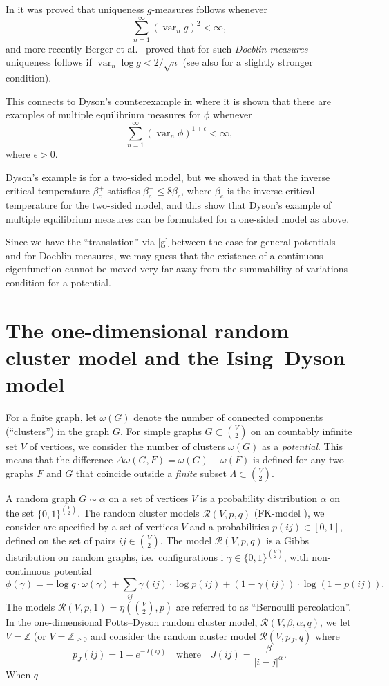 \documentclass[11pt, a4paper]{amsart}
\theoremstyle{definition}
\theoremstyle{remark}
\providecommand{\ZZ}{\mathbb{Z}}
\providecommand{\mscr}{\mathscr}
\providecommand{\opn}{\operatorname}
\providecommand{\var}{\opn{var}}
\providecommand{\w}{\omega}
\begin{document}
In \cite{johob} it was proved that uniqueness $g$-measures follows
whenever
$$ \sum_{n=1}^\infty (\var_n g)^2<\infty, $$
and more recently Berger et al.\ \cite{berger2} proved that for such {\em Doeblin
measures} uniqueness follows if $\var_n \log g <2/\sqrt{n}$ (see also
\cite{johob3} for a slightly stronger condition).

This connects to Dyson's counterexample in \cite{dyson} where it is shown that
there are examples of multiple equilibrium measures for $\phi$ whenever
$$\sum_{n=1}^\infty (\var_n \phi)^{1+\epsilon}<\infty,$$
where $\epsilon>0$.

Dyson's example is for a two-sided model, but we showed in \cite{johob4} that
the inverse critical temperature $\beta_c^+$ satisfies $\beta_c^+\leq 8\beta_c$, where $\beta_c$ is
the inverse critical temperature for the two-sided model, and this show that
Dyson's example of multiple equilibrium measures can be formulated for a
one-sided model as above.

Since we have the ``translation'' via \eqref{g} between the case for general
potentials and for Doeblin measures, we may guess that the existence of a
continuous eigenfunction cannot be moved very far away from the summability of
variations condition for a potential.

\section{The one-dimensional random cluster model and the Ising--Dyson model}

For a finite graph, let $\w(G)$ denote the number of connected components
(``clusters'') in the graph $G$. For simple graphs $G\subset \binom V2$ on an
countably infinite set $V$ of vertices, we consider the number of clusters
$\w(G)$ as a \emph{potential}. This means that the difference
$\Delta\w(G,F) = \w(G)-\w(F)$ is defined for any two graphs $F$ and $G$ that
coincide outside a \emph{finite} subset $\Lambda\subset \binom V2$.

A random graph $G\sim\alpha$ on a set of vertices $V$ is a probability
distribution $\alpha$ on the set $\{0,1\}^{\binom V2}$. The random cluster
models $\mscr R(V,p,q)$ (FK-model \cite{grimmet}), we consider are specified by a set 
of vertices $V$ and a probabilities $p(ij)\in[0,1]$, defined on the set of pairs
$ij\in \binom V2$. The model $\mscr R(V,p,q)$ is a Gibbs distribution on random
graphs, i.e.\ configurations i $\gamma\in\{0,1\}^{\binom V2}$, with 
non-continuous potential
$$
\phi(\gamma) = 
- \log q \cdot\w(\gamma) + 
\sum_{ij}\gamma(ij)\cdot \log p(ij) + (1-\gamma(ij))\cdot\log (1-p(ij)).
$$
The models $\mscr R(V,p,1)=\eta(\binom V2,p)$ 
are referred to as ``Bernoulli percolation''. 
In the one-dimensional Potts--Dyson random cluster model, 
$\mscr R(V,\beta,\alpha,q)$,
we let $V=\ZZ$ (or $V=\ZZ_{\ge0}$ and consider the random cluster model 
$\mscr R(V,p_J,q)$ where 
\begin{equation}\label{eq:Jdef}
  p_J(ij) = 1-e^{-J(ij)} \quad\text{where}\quad 
  J({ij}) = \frac \beta{|i-j|^\alpha}.
\end{equation}
When $q$
\end{document}
